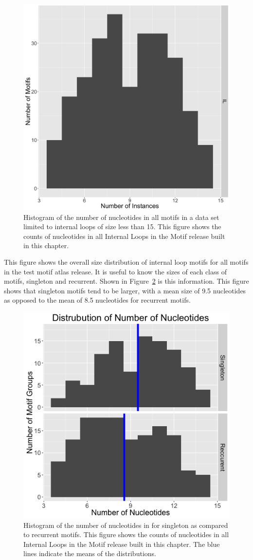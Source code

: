 \begin{figure}
  \includegraphics[width=0.5\linewidth]{chapter-5/figs/motifs/nucleotides}
  \caption{Histogram of the number of nucleotides in all motifs in a data set
  limited to internal loops of size less than 15. This figure shows the counts
  of nucleotides in all Internal Loops in the Motif release built in this
  chapter.}
  \label{fig:num-motif-nucleotides}
\end{figure}

This figure shows the overall size distribution of internal loop motifs for all
motifs in the test motif atlas release. It is useful to know the sizes of each
class of motifs, singleton and recurrent. Shown in
Figure~\ref{fig:num-nt-by-class} is this information. This figure shows that
singleton motifs tend to be larger, with a mean size of 9.5 nucleotides as
opposed to the mean of 8.5 nucleotides for recurrent motifs.

\begin{figure}
  \includegraphics[width=0.5\linewidth]{chapter-5/figs/motifs/nucleotides-by-class}
  \caption{Histogram of the number of nucleotides in for singleton as compared
  to recurrent motifs. This figure shows the counts of nucleotides in all
  Internal Loops in the Motif release built in this chapter. The blue lines
  indicate the means of the distributions.}
  \label{fig:num-nt-by-class}
\end{figure}

